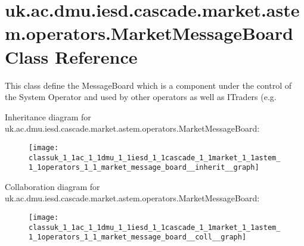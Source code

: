 \hypertarget{classuk_1_1ac_1_1dmu_1_1iesd_1_1cascade_1_1market_1_1astem_1_1operators_1_1_market_message_board}{\section{uk.\-ac.\-dmu.\-iesd.\-cascade.\-market.\-astem.\-operators.\-Market\-Message\-Board Class Reference}
\label{classuk_1_1ac_1_1dmu_1_1iesd_1_1cascade_1_1market_1_1astem_1_1operators_1_1_market_message_board}
}


This class define the Message\-Board which is a component under the control of the System Operator and used by other operators as well as I\-Traders (e.\-g.  




Inheritance diagram for uk.\-ac.\-dmu.\-iesd.\-cascade.\-market.\-astem.\-operators.\-Market\-Message\-Board\-:\nopagebreak
\begin{figure}[H]
\begin{center}
\leavevmode
\texttt{[image: classuk\_1\_1ac\_1\_1dmu\_1\_1iesd\_1\_1cascade\_1\_1market\_1\_1astem\_1\_1operators\_1\_1\_market\_message\_board\_\_inherit\_\_graph]}
\end{center}
\end{figure}


Collaboration diagram for uk.\-ac.\-dmu.\-iesd.\-cascade.\-market.\-astem.\-operators.\-Market\-Message\-Board\-:\nopagebreak
\begin{figure}[H]
\begin{center}
\leavevmode
\texttt{[image: classuk\_1\_1ac\_1\_1dmu\_1\_1iesd\_1\_1cascade\_1\_1market\_1\_1astem\_1\_1operators\_1\_1\_market\_message\_board\_\_coll\_\_graph]}
\end{center}
\end{figure}
